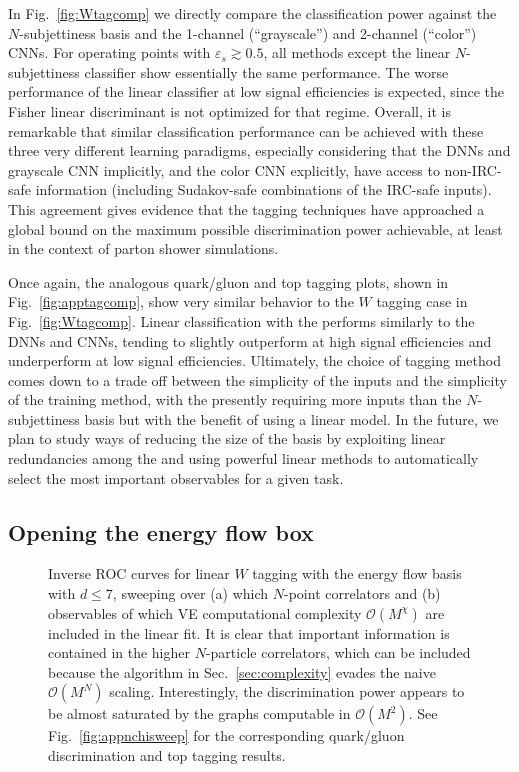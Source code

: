 \documentclass[letterpaper,11pt]{article}
\DeclareRobustCommand{\Sec}[1]{Sec.~\ref{#1}}
\DeclareRobustCommand{\Fig}[1]{Fig.~\ref{#1}}
\newcommand{\B}{\text{EFP}\xspace}
\newcommand{\Bs}{\text{EFPs}\xspace}
\begin{document}
In \Fig{fig:Wtagcomp} we directly compare the \B classification power against the $N$-subjettiness basis and the 1-channel (``grayscale'') and 2-channel (``color'') CNNs. 
%
For operating points with $\varepsilon_s\gtrsim0.5$, all methods except the linear $N$-subjettiness classifier show essentially the same performance.
%
The worse performance of the linear \B classifier at low signal efficiencies is expected, since the Fisher linear discriminant is not optimized for that regime.
%
Overall, it is remarkable that similar classification performance can be achieved with these three very different learning paradigms, especially considering that the DNNs and grayscale CNN implicitly, and the color CNN explicitly, have access to non-IRC-safe information (including Sudakov-safe combinations of the IRC-safe inputs).
%
This agreement gives evidence that the tagging techniques have approached a global bound on the maximum possible discrimination power achievable, at least in the context of parton shower simulations.

Once again, the analogous quark/gluon and top tagging plots, shown in \Fig{fig:apptagcomp}, show very similar behavior to the $W$ tagging case in \Fig{fig:Wtagcomp}.
%
Linear classification with the \Bs performs similarly to the DNNs and CNNs, tending to slightly outperform at high signal efficiencies and underperform at low signal efficiencies.
%
Ultimately, the choice of tagging method comes down to a trade off between the simplicity of the inputs and the simplicity of the training method, with the \Bs presently requiring more inputs than the $N$-subjettiness basis but with the benefit of using a linear model.
%
In the future, we plan to study ways of reducing the size of the \B basis by exploiting linear redundancies among the \Bs and using powerful linear methods to automatically select the most important observables for a given task.


\subsection{Opening the energy flow box}
\label{sec:openbox}

\begin{figure}
\centering
{}
\caption{Inverse ROC curves for linear $W$ tagging with the energy flow basis with $d\le 7$, sweeping over (a) which $N$-point correlators and (b) observables of which VE computational complexity $\mathcal O(M^\chi)$ are included in the linear fit.  It is clear that important information is contained in the higher $N$-particle correlators, which can be included because the algorithm in \Sec{sec:complexity} evades the naive $\mathcal O(M^N)$ scaling.  Interestingly, the discrimination power appears to be almost saturated by the graphs computable in $\mathcal O(M^2)$.  See \Fig{fig:appnchisweep} for the corresponding quark/gluon discrimination and top tagging results.}
\label{fig:efpnsweep}
\end{figure}
\end{document}
